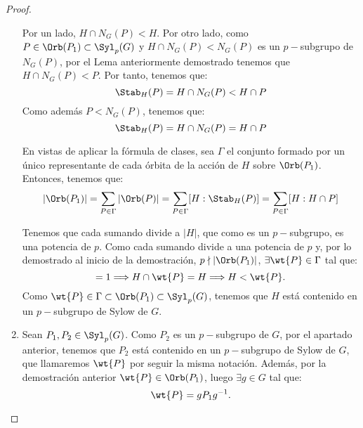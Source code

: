\begin{ejercicio}
\begin{teo}
\begin{proof}
\begin{enumerate}
                Por un lado, $H\cap N_G(P)<H$. Por otro lado, como $P\in \Orb(P_1)\subset \Syl_p(G)$ y $H\cap N_G(P)<N_G(P)$ es un $p-$subgrupo de \(N_G(P)\), por el Lema anteriormente demostrado tenemos que $H\cap N_G(P)<P$. Por tanto, tenemos que:
                \begin{equation*}
                    \Stab_{H}(P) = H\cap N_G(P) < H\cap P
                \end{equation*}
                Como además $P<N_G(P)$, tenemos que:
                \begin{equation*}
                    \Stab_{H}(P) = H\cap N_G(P) = H\cap P
                \end{equation*}

                En vistas de aplicar la fórmula de clases, sea $\Gamma$ el conjunto formado por un único representante de cada órbita de la acción de \(H\) sobre \(\Orb(P_1)\). Entonces, tenemos que:
                \begin{equation}\label{eq:orbita2}
                    |\Orb(P_1)| = \sum_{P\in \Gamma} |\Orb(P)|
                    = \sum_{P\in \Gamma} [H:\Stab_{H}(P)]
                    = \sum_{P\in \Gamma} [H:H\cap P]
                \end{equation}

                Tenemos que cada sumando divide a $|H|$, que como es un \(p-\)subgrupo, es una potencia de \(p\). Como cada sumando divide a una potencia de $p$ y, por lo demostrado al inicio de la demostración, $p\nmid |\Orb(P_1)|$, $\exists \wt{P}\in \Gamma$ tal que:
                \begin{equation*}
                    [H:H\cap \wt{P}] = 1 \Longrightarrow H\cap \wt{P} = H\Longrightarrow H< \wt{P}.
                \end{equation*}
                Como $\wt{P}\in \Gamma\subset \Orb(P_1)\subset \Syl_p(G)$, tenemos que \(H\) está contenido en un \(p-\)subgrupo de Sylow de \(G\).

                \item Sean \(P_1, P_2\in \Syl_p(G)\). Como $P_2$ es un \(p-\)subgrupo de $G$, por el apartado anterior, tenemos que \(P_2\) está contenido en un \(p-\)subgrupo de Sylow de \(G\), que llamaremos $\wt{P}$ por seguir la misma notación. Además, por la demostración anterior $\wt{P}\in \Orb(P_1)$, luego $\exists g\in G$ tal que:
                \begin{equation*}
                    \wt{P} = gP_1g^{-1}.
                \end{equation*}


\end{enumerate}
\end{proof}
\end{teo}
\end{ejercicio}
